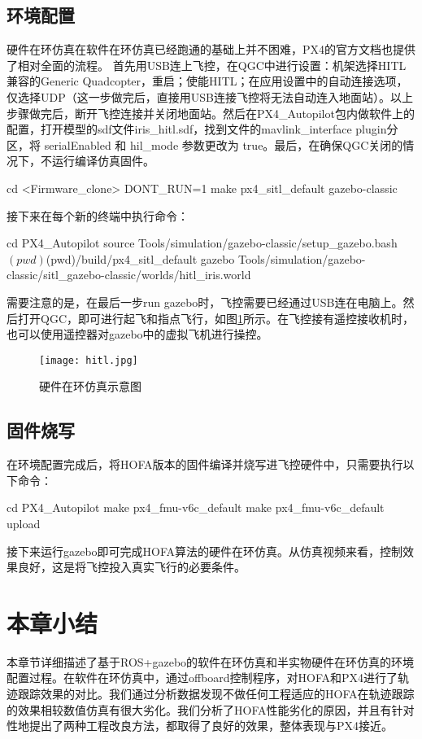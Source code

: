 \subsection*{环境配置}
硬件在环仿真在软件在环仿真已经跑通的基础上并不困难，PX4的官方文档也提供了相对全面的流程\cite{px4}。
首先用USB连上飞控，在QGC中进行设置：机架选择HITL兼容的Generic Quadcopter，重启；使能HITL；在应用设置中的自动连接选项，仅选择UDP（这一步做完后，直接用USB连接飞控将无法自动连入地面站）。以上步骤做完后，断开飞控连接并关闭地面站。然后在PX4\_Autopilot包内做软件上的配置\cite{px4}，打开模型的sdf文件iris\_hitl.sdf，找到文件的mavlink\_interface plugin分区，将 serialEnabled 和 hil\_mode 参数更改为 true。最后，在确保QGC关闭的情况下，不运行编译仿真固件。
\begin{codeblock}[language=C]
  cd <Firmware_clone>
  DONT_RUN=1 make px4_sitl_default gazebo-classic
\end{codeblock}
接下来在每个新的终端中执行命令：
\begin{codeblock}[language=C]
  cd PX4_Autopilot
  source Tools/simulation/gazebo-classic/setup_gazebo.bash $(pwd) $(pwd)/build/px4_sitl_default
  gazebo Tools/simulation/gazebo-classic/sitl_gazebo-classic/worlds/hitl_iris.world
\end{codeblock}
需要注意的是，在最后一步run gazebo时，飞控需要已经通过USB连在电脑上。然后打开QGC，即可进行起飞和指点飞行，如图\ref{hitl}所示。在飞控接有遥控接收机时，也可以使用遥控器对gazebo中的虚拟飞机进行操控。
\begin{figure}[!h]
  \centering
  \texttt{[image: hitl.jpg]}
  \caption{硬件在环仿真示意图}
  \label{hitl}
\end{figure}
\subsection*{固件烧写}
在环境配置完成后，将HOFA版本的固件编译并烧写进飞控硬件中，只需要执行以下命令：
\begin{codeblock}[language=C]
  cd PX4_Autopilot
  make px4_fmu-v6c_default
  make px4_fmu-v6c_default upload
\end{codeblock}
接下来运行gazebo即可完成HOFA算法的硬件在环仿真。从仿真视频来看，控制效果良好，这是将飞控投入真实飞行的必要条件。
\section{本章小结}
本章节详细描述了基于ROS+gazebo的软件在环仿真和半实物硬件在环仿真的环境配置过程。在软件在环仿真中，通过offboard控制程序，对HOFA和PX4进行了轨迹跟踪效果的对比。我们通过分析数据发现不做任何工程适应的HOFA在轨迹跟踪的效果相较数值仿真有很大劣化。我们分析了HOFA性能劣化的原因，并且有针对性地提出了两种工程改良方法，都取得了良好的效果，整体表现与PX4接近。